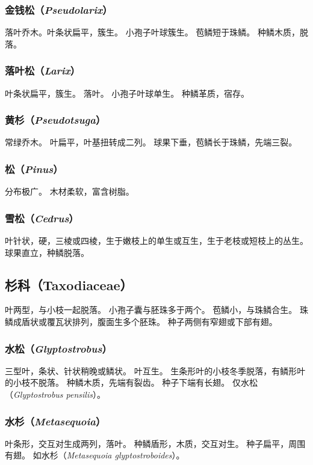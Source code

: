 \documentclass[11pt]{article}
\begin{document}
\begin{sloppypar}
\subsubsection{金钱松（\textit{Pseudolarix}）}
落叶乔木。叶条状扁平，簇生。
小孢子叶球簇生。
苞鳞短于珠鳞。
种鳞木质，脱落。

\subsubsection{落叶松（\textit{Larix}）}
叶条状扁平，簇生。
落叶。
小孢子叶球单生。
种鳞革质，宿存。

\subsubsection{黄杉（\textit{Pseudotsuga}）}
常绿乔木。
叶扁平，叶基扭转成二列。
球果下垂，苞鳞长于珠鳞，先端三裂。

\subsubsection{松（\textit{Pinus}）}
分布极广。
木材柔软，富含树脂。

\subsubsection{雪松（\textit{Cedrus}）}
叶针状，硬，三棱或四棱，生于嫩枝上的单生或互生，生于老枝或短枝上的丛生。
球果直立，种鳞脱落。

\subsection{杉科（Taxodiaceae）}
叶两型，与小枝一起脱落。
小孢子囊与胚珠多于两个。
苞鳞小，与珠鳞合生。
珠鳞成盾状或覆瓦状排列，腹面生多个胚珠。
种子两侧有窄翅或下部有翅。

\subsubsection{水松（\textit{Glyptostrobus}）}
三型叶，条状、针状稍晚或鳞状。
叶互生。
生条形叶的小枝冬季脱落，有鳞形叶的小枝不脱落。
种鳞木质，先端有裂齿。
种子下端有长翅。
仅水松（\textit{Glyptostrobus pensilis}）。

\subsubsection{水杉（\textit{Metasequoia}）}
叶条形，交互对生成两列，落叶。
种鳞盾形，木质，交互对生。
种子扁平，周围有翅。
如水杉（\textit{Metasequoia glyptostroboides}）。


\end{sloppypar}
\end{document}
